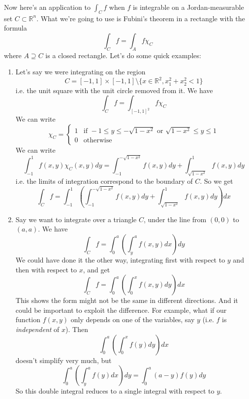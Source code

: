 \documentclass{article}
\newcommand{\reals}[0]{\mathbb{R}}
\newcommand{\indic}[1]{\chi_{#1}}
\begin{document}
Now here's an application to \(\int_Cf\) when \(f\) is integrable on a Jordan-measurable set \(C \subset \reals^n\). What we're going to use is Fubini's theorem in a rectangle with the formula
\begin{equation}
  \int_Cf = \int_Af\indic{C}
\end{equation}
where \(A \supseteq C\) is a closed rectangle.
Let's do some quick examples:
\begin{enumerate}

\item Let's say we were integrating on the region
\begin{equation}
  C = [-1, 1] \times [-1, 1] \setminus \{x \in \reals^2, x_1^2 + x_2^2 < 1\}
\end{equation}
i.e. the unit square with the unit circle removed from it. We have
\begin{equation}
  \int_Cf = \int_{[-1, 1]^2}f\indic{C}
\end{equation}
We can write
\begin{equation}
  \indic{C} = \left\{\begin{array}{cc}
    1 & \text{if } -1 \leq y \leq -\sqrt{1 - x^2} \text{ or } \sqrt{1 - x^2} \leq y \leq 1 \\
    0 & \text{otherwise}
  \end{array}\right.
\end{equation}
We can write
\begin{equation}
  \int_{-1}^1f(x, y)\indic{C}(x, y)dy = \int_{-1}^{-\sqrt{1 - x^2}}f(x, y)dy + \int_{\sqrt{1 - x^2}}^1f(x, y)dy
\end{equation}
i.e. the limits of integration correspond to the boundary of \(C\). So we get
\begin{equation}
  \int_Cf = \int_{-1}^1\left(\int_{-1}^{-\sqrt{1 - x^2}}f(x, y)dy + \int_{\sqrt{1 - x^2}}^1f(x, y)dy\right)dx
\end{equation}

\item Say we want to integrate over a triangle \(C\), under the line from \((0, 0)\) to \((a, a)\). We have
\begin{equation}
  \int_Cf = \int_0^a\left(\int_y^af(x, y)dx\right)dy
\end{equation}
We could have done it the other way, integrating first with respect to \(y\) and then with respect to \(x\), and get
\begin{equation}
  \int_Cf = \int_0^a\left(\int_0^xf(x, y)dy\right)dx
\end{equation}
This shows the form might not be the same in different directions. And it could be important to exploit the difference. For example, what if our function \(f(x, y)\) only depends on one of the variables, say \(y\) (i.e. \(f\) is \textit{independent} of \(x\)). Then
\begin{equation}
  \int_0^a\left(\int_0^xf(y)dy\right)dx
\end{equation}
doesn't simplify very much, but
\begin{equation}
  \int_0^a\left(\int_y^af(y)dx\right)dy = \int_0^a(a - y)f(y)dy
\end{equation}
So this double integral reduces to a single integral with respect to \(y\).


\end{enumerate}
\end{document}
